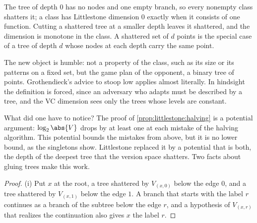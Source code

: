 \begin{refsection}
The tree of depth $0$ has no nodes and one empty branch, so every nonempty class shatters it; a class has Littlestone dimension $0$ exactly when it consists of one function. Cutting a shattered tree at a smaller depth leaves it shattered, and the dimension is monotone in the class. A shattered set of $d$ points is the special case of a tree of depth $d$ whose nodes at each depth carry the same point.

The new object is humble: not a property of the class, such as its size or its patterns on a fixed set, but the game plan of the opponent, a binary tree of points. Grothendieck's advice to stoop low applies almost literally. In hindsight the definition is forced, since an adversary who adapts must be described by a tree, and the VC dimension sees only the trees whose levels are constant.

What did one have to notice? The proof of \cref{prop:littlestone:halving} is a potential argument: $\log_2\abs{V}$ drops by at least one at each mistake of the halving algorithm. This potential bounds the mistakes from above, but it is no lower bound, as the singletons show. Littlestone replaced it by a potential that is both, the depth of the deepest tree that the version space shatters. Two facts about gluing trees make this work.


\begin{proof}
(i) Put $x$ at the root, a tree shattered by $V_{(x,0)}$ below the edge $0$, and a tree shattered by $V_{(x,1)}$ below the edge $1$. A branch that starts with the label $r$ continues as a branch of the subtree below the edge $r$, and a hypothesis of $V_{(x,r)}$ that realizes the continuation also gives $x$ the label $r$.


\end{proof}
\end{refsection}
